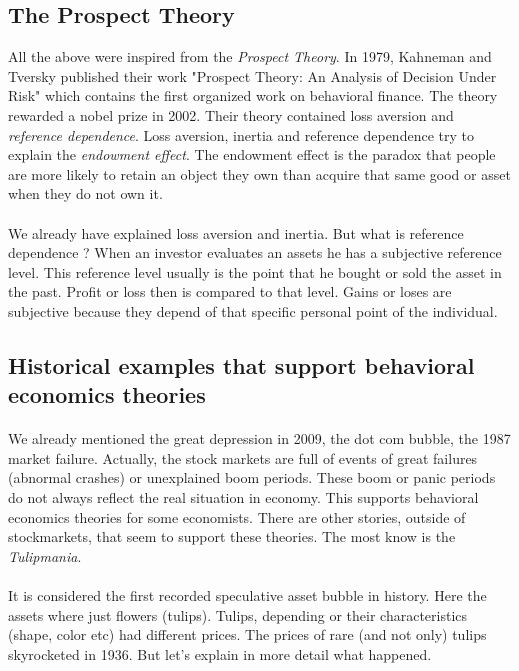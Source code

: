 \documentclass{article}
\begin{document}
\subsection{The Prospect Theory}
All the above were inspired from the \emph{Prospect Theory}. In 1979, Kahneman and Tversky published their work "Prospect Theory: An Analysis of Decision Under Risk" which contains the first organized work on behavioral finance. The theory rewarded a nobel prize in 2002. Their theory contained loss aversion and \emph{reference dependence}. Loss aversion, inertia and reference dependence try to explain the \emph{endowment effect}. The endowment effect is the paradox that people are more likely to retain an object they own than acquire that same good or asset when they do not own it.
\paragraph{ }
We already have explained loss aversion and inertia. But what is reference dependence ?
When an investor evaluates an assets he has a subjective reference level. This reference level usually is the point that he bought or sold the asset in the past. Profit or loss then is compared to that level. Gains or loses are subjective because they depend of that specific personal point of the individual.
\paragraph{ }
\subsection{Historical examples that support behavioral economics theories}
\paragraph{ }
We already mentioned the great depression in 2009, the dot com bubble, the 1987 market failure. Actually, the stock markets are full of events of great failures (abnormal crashes) or unexplained boom periods. These boom or panic periods do not always reflect the real situation in economy. This supports behavioral economics theories for some economists. There are other stories, outside of stockmarkets, that seem to support these theories. The most know is the \emph{Tulipmania}.
\paragraph{ }
It is considered the first recorded speculative asset bubble in history. Here the assets where just flowers (tulips). Tulips, depending or their characteristics (shape, color etc) had different prices. The prices of rare (and not only) tulips skyrocketed in 1936.
But let's explain in more detail what happened.
\end{document}
